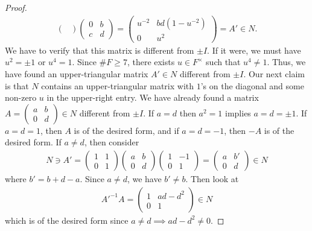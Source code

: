 \begin{proof}
\begin{align}
\begin{pmatrix}
        \end{pmatrix} \begin{pmatrix}
            0 & b \\ c & d
        \end{pmatrix} = \begin{pmatrix}
            u^{-2} & bd(1-u^{-2}) \\ 0 & u^{2}
        \end{pmatrix} = A' \in N.
    \end{align}
    We have to verify that this matrix is different from $\pm I$. If it were, we must have $u^{2} = \pm 1$ or $u^{4} = 1$. Since $\# F \geq 7$, there exists $u \in F^{\times}$ such that $u^{4} \neq 1$. Thus, we have found an upper-triangular matrix $A' \in N$ different from $\pm I$. Our next claim is that $N$ contains an upper-triangular matrix with $1$'s on the diagonal and some non-zero $u$ in the upper-right entry. We have already found a matrix $A = \begin{pmatrix}
        a & b \\ 0 & d
    \end{pmatrix} \in N$ different from $\pm I$. If $a = d$ then $a^{2} = 1$ implies $a = d = \pm 1$. If $a = d = 1$, then $A$ is of the desired form, and if $a = d = -1$, then $-A$ is of the desired form. If $a \neq d$, then consider
    \begin{align}
        N \ni A' = \begin{pmatrix}
            1 & 1 \\ 0 & 1
        \end{pmatrix} \begin{pmatrix}
            a & b \\ 0 & d
        \end{pmatrix}
        \begin{pmatrix}
            1 & -1 \\ 0 & 1
        \end{pmatrix} = \begin{pmatrix}
            a & b' \\ 0 & d
        \end{pmatrix} \in N
    \end{align}
    where $b' = b + d - a$. Since $a \neq d$, we have $b' \neq b$. Then look at
    \begin{align}
        A'^{-1} A = \begin{pmatrix}
            1 & ad-d^{2} \\ 0 & 1
        \end{pmatrix} \in N
    \end{align}
    which is of the desired form since $a \neq d \implies ad-d^{2} \neq 0$.


\end{proof}

